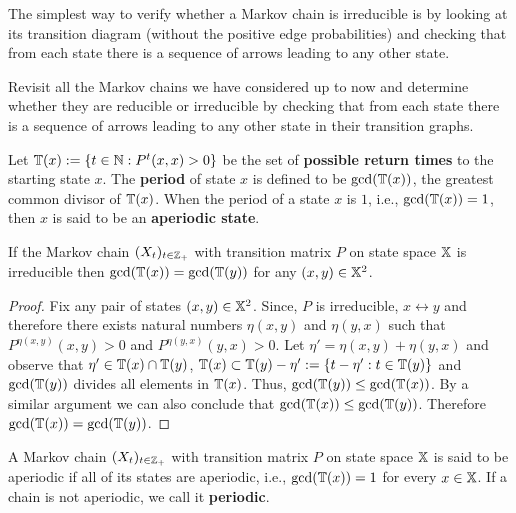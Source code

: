 {The simplest way to verify whether a Markov chain is irreducible is by looking at its transition diagram (without the positive edge probabilities) and checking that from each state there is a sequence of arrows leading to any other state.  %

\begin{exercise}\label{EXR:ExsIrreducibleOrNot}
Revisit all the Markov chains we have considered up to now and determine whether they are reducible or irreducible by checking that from each state there is a sequence of arrows leading to any other state in their transition graphs.
\end{exercise}

\begin{definition}
Let $\mathbb{T}(x) := \{t \in \mathbb{N} : P^t(x,x)>0\}$ be the set of {\bf possible return times} to the starting state $x$.  The {\bf period} of state $x$ is defined to be $\gcd(\mathbb{T}(x))$, the greatest common divisor of $\mathbb{T}(x)$.  When the period of a state $x$ is $1$, i.e., $\gcd(\mathbb{T}(x))=1$, then $x$ is said to be an {\bf aperiodic state}.
\end{definition}

\begin{prop}
If the Markov chain $(X_t)_{t\in\mathbb{Z}_+}$ with transition matrix $P$ on state space $\mathbb{X}$ is irreducible then $\gcd(\mathbb{T}(x)) = \gcd(\mathbb{T}(y))$ for any $(x,y) \in \mathbb{X}^2$.
\begin{proof}
Fix any pair of states $(x,y) \in \mathbb{X}^2$.  Since, $P$ is irreducible, $x \leftrightarrow y$ and therefore there exists natural numbers $\eta(x,y)$ and $\eta(y,x)$ such that $P^{\eta(x,y)}(x,y)>0$ and $P^{\eta(y,x)}(y,x)>0$.  Let $\eta' = \eta(x,y)+\eta(y,x)$ and observe that $\eta' \in \mathbb{T}(x) \cap \mathbb{T}(y)$, $\mathbb{T}(x) \subset \mathbb{T}(y) - \eta' := \{t-\eta' : t \in \mathbb{T}(y)\}$ and $\gcd(\mathbb{T}(y))$ divides all elements in $\mathbb{T}(x)$.  Thus, $\gcd(\mathbb{T}(y)) \leq \gcd(\mathbb{T}(x))$.  By a similar argument we can also conclude that $\gcd(\mathbb{T}(x)) \leq \gcd(\mathbb{T}(y))$.  Therefore $\gcd(\mathbb{T}(x))=\gcd(\mathbb{T}(y))$.
\end{proof}
\end{prop}

\begin{definition}[Aperiodic]
A Markov chain $(X_t)_{t\in\mathbb{Z}_+}$ with transition matrix $P$ on state space $\mathbb{X}$ is said to be {aperiodic} if all of its states are aperiodic, i.e., $\gcd(\mathbb{T}(x))=1$ for every $x \in \mathbb{X}$.  If a chain is not aperiodic, we call it {\bf periodic}.
\end{definition}

}
